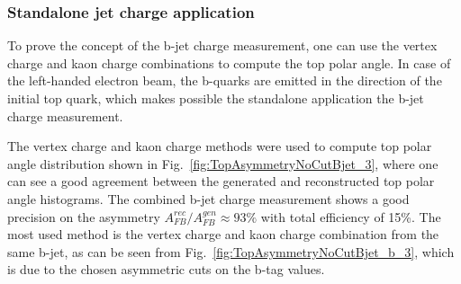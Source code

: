 \subsubsection{Standalone jet charge application}

To prove the concept of the b-jet charge measurement, one can use the vertex charge and kaon charge combinations to compute the top polar angle. 
In case of the left-handed electron beam, the b-quarks are emitted in the direction of the initial top quark, which makes possible the standalone application the b-jet charge measurement. 

The vertex charge and kaon charge methods were used to compute top polar angle distribution shown in Fig.~\ref{fig:TopAsymmetryNoCutBjet_3}, where one can see a good agreement between the generated and reconstructed top polar angle histograms. 
The combined b-jet charge measurement shows a good precision on the asymmetry $A_{FB}^{rec}/A^{gen}_{FB} \approx 93\%$ with total efficiency of 15\%.
The most used method is the vertex charge and kaon charge combination from the same b-jet, as can be seen from Fig.~\ref{fig:TopAsymmetryNoCutBjet_b_3}, which is due to the chosen asymmetric cuts on the b-tag values. 
